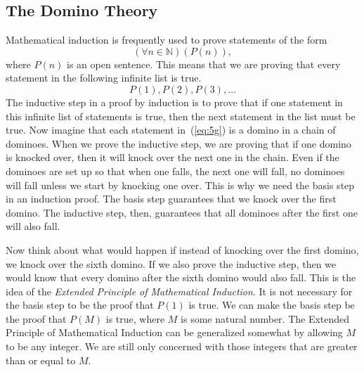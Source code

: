 \subsection*{The Domino Theory}
Mathematical induction is frequently used to prove statements of the form
\begin{equation} \label{eq:5f}
\left( {\forall n \in \mathbb{N}} \right)\left( {P( n )} \right),
\end{equation}
where  $P( n )$ is an open sentence.  This means that we are proving that every statement in the following infinite list is true.
\begin{equation} \label{eq:5g}
P( 1 ),P( 2 ),P( 3 ), \ldots 
\end{equation}
%
The inductive step in a proof by induction is to prove that if one statement in this infinite list of statements is true, then the next statement in the list must be true.  Now imagine that each statement in~(\ref{eq:5g})  is a domino in a chain of dominoes.  When we prove the inductive step, we are proving that if one domino is knocked over, then it will knock over the next one in the chain.  Even if the dominoes are set up so that when one falls, the next one will fall, no dominoes will fall unless we start by knocking one over.  This is why we need the basis step in an induction proof.  The basis step guarantees that we knock over the first domino.  The inductive step, then, guarantees that all dominoes after the first one will also fall.

Now think about what would happen if instead of knocking over the first domino, we knock over the sixth domino.  If we also prove the inductive step, then we would know that every domino after the sixth domino would also fall.  This is the idea of the \emph{Extended Principle of Mathematical Induction}.  It is not necessary for the basis step to be the proof that  $P( 1 )$  is true.  We can make the basis step be the proof that  $P( M )$ is true,  where  $M$  is some natural number.  The Extended Principle of Mathematical Induction can be generalized somewhat by allowing  $M$  to be any integer.  We are still only concerned with those integers that are greater than or equal to  $M$\!.  


